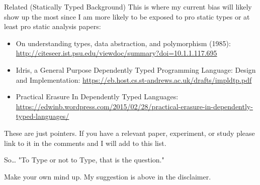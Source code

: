 \documentclass[presentation]{beamer}
\begin{document}
\begin{frame}[label={sec:org2076381}]{Related (Statically Typed Background)}
This is where my current bias will likely show up the most since I am
more likely to be exposed to pro static types or at least pro static analysis papers:

\begin{itemize}
\item On understanding types, data abstraction, and polymorphism (1985):
\url{http://citeseer.ist.psu.edu/viewdoc/summary?doi=10.1.1.117.695}
\item Idris, a General Purpose Dependently Typed Programming Language: Design and Implementation:
\url{https://eb.host.cs.st-andrews.ac.uk/drafts/impldtp.pdf}
\item Practical Erasure In Dependently Typed Languages:
\url{https://edwinb.wordpress.com/2015/02/28/practical-erasure-in-dependently-typed-languages/}
\end{itemize}

These are just pointers. If you have a relevant paper, experiment, or study please link to it in the comments and I will add to this list.
\end{frame}

\begin{frame}[label={sec:orgcec2964}]{So\ldots{}}
\alert{"To Type or not to Type, that is the question."}

Make your own mind up. My suggestion is above in the disclaimer.
\end{frame}
\end{document}

